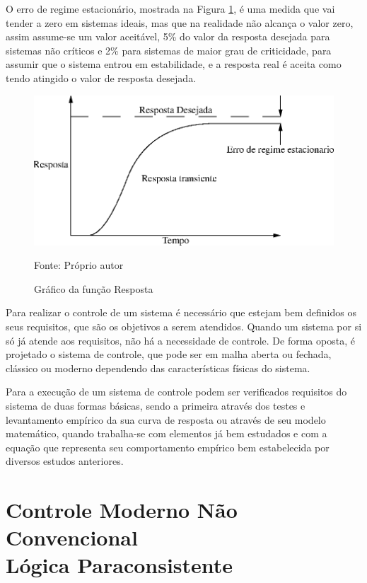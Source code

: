 O erro de regime estacionário, mostrada na Figura \ref{fig:funcaoResposta}, é uma medida que vai tender a zero em sistemas ideais, mas que na realidade não alcança o valor zero, assim assume-se um valor aceitável, 5\% do valor da resposta desejada para sistemas não críticos e 2\% para sistemas de maior grau de criticidade, para assumir que o sistema entrou em estabilidade, e a resposta real é aceita como tendo atingido o valor de resposta desejada. 

\begin{figure}[!htb]
\centering
\caption{Gráfico da função Resposta}
\center\includegraphics[scale=1]{./pic/C400grafico.eps}
\label{fig:funcaoResposta}

{\small Fonte: Próprio autor}
\end{figure}

Para realizar o controle de um sistema é necessário que estejam bem definidos os seus requisitos, que são os objetivos a serem atendidos. Quando um sistema por si só já atende aos requisitos, não há a necessidade de controle. De forma oposta, é projetado o sistema de controle, que pode ser em malha aberta ou fechada, clássico ou moderno dependendo das características físicas do sistema. 

Para a execução de um sistema de controle podem ser verificados requisitos do sistema de duas formas básicas, sendo a primeira através dos testes e levantamento empírico da sua curva de resposta ou através de seu modelo matemático, quando trabalha-se com elementos já bem estudados e com a equação que representa seu comportamento empírico bem estabelecida por diversos estudos anteriores.



\newpage



\section{Controle Moderno Não Convencional \\ Lógica Paraconsistente}

